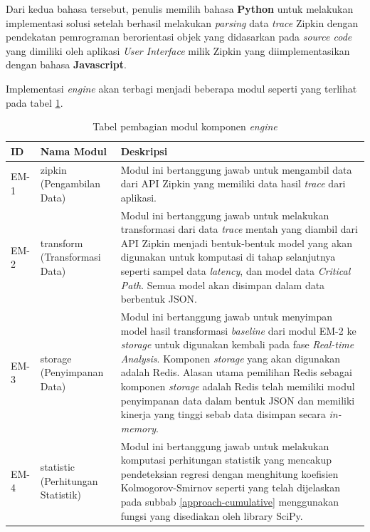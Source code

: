 Dari kedua bahasa tersebut, penulis memilih bahasa \textbf{Python} untuk melakukan implementasi solusi setelah berhasil melakukan \textit{parsing} data \textit{trace} Zipkin dengan pendekatan pemrograman berorientasi objek yang didasarkan pada \textit{source code} yang dimiliki oleh aplikasi \textit{User Interface} milik Zipkin yang diimplementasikan dengan bahasa \textbf{Javascript}. 

Implementasi \textit{engine} akan terbagi menjadi beberapa modul seperti yang terlihat pada tabel \ref{engine-module}.

\begin{small}
	\begin{longtable}{ | p{1cm} | p{3cm} | p{10cm} | }
		\caption{Tabel pembagian modul komponen \textit{engine}}
		\label{engine-module}                                                           
		\\ \hline
		\centering\bfseries{ID} & \centering\bfseries{Nama Modul} & \centering\bfseries{Deskripsi} \tabularnewline \hline
		\endfirsthead
		EM-1 & zipkin (Pengambilan Data) & Modul ini bertanggung jawab untuk mengambil data dari API Zipkin yang memiliki data hasil \textit{trace} dari aplikasi. \\ \hline
		EM-2 & transform (Transformasi Data) & Modul ini bertanggung jawab untuk melakukan transformasi dari data \textit{trace} mentah yang diambil dari API Zipkin menjadi bentuk-bentuk model yang akan digunakan untuk komputasi di tahap selanjutnya seperti sampel data \textit{latency}, dan model data \textit{Critical Path}. Semua model akan disimpan dalam data berbentuk JSON. \\ \hline
		EM-3 & storage (Penyimpanan Data) & Modul ini bertanggung jawab untuk menyimpan model hasil transformasi \textit{baseline} dari modul EM-2 ke \textit{storage} untuk digunakan kembali pada fase \textit{Real-time Analysis}. Komponen \textit{storage} yang akan digunakan adalah Redis. Alasan utama pemilihan Redis sebagai komponen \textit{storage} adalah Redis telah memiliki modul penyimpanan data dalam bentuk JSON dan memiliki kinerja yang tinggi sebab data disimpan secara \textit{in-memory}. \\ \hline
		EM-4 & statistic (Perhitungan Statistik) & Modul ini bertanggung jawab untuk melakukan komputasi perhitungan statistik yang mencakup pendeteksian regresi dengan menghitung koefisien Kolmogorov-Smirnov seperti yang telah dijelaskan pada subbab \ref{approach-cumulative} menggunakan fungsi yang disediakan oleh library SciPy. \\ \hline

\end{longtable}
\end{small}
